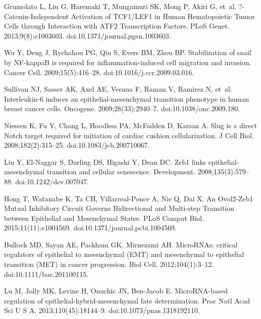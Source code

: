 \documentclass[11pt,letterpaper]{article}
\begin{document}
\begin{thebibliography}{10}
Grumolato L, Liu G, Haremaki T, Mungamuri SK, Mong P, Akiri G, et~al.
\newblock ?-Catenin-Independent Activation of TCF1/LEF1 in Human Hematopoietic
  Tumor Cells through Interaction with ATF2 Transcription Factors.
\newblock PLoS Genet. 2013;9(8):e1003603.
\newblock doi:{10.1371/journal.pgen.1003603}.

Wu Y, Deng J, Rychahou PG, Qiu S, Evers BM, Zhou BP.
\newblock Stabilization of snail by NF-kappaB is required for
  inflammation-induced cell migration and invasion.
\newblock Cancer Cell. 2009;15(5):416--28.
\newblock doi:{10.1016/j.ccr.2009.03.016}.

Sullivan NJ, Sasser AK, Axel AE, Vesuna F, Raman V, Ramirez N, et~al.
\newblock Interleukin-6 induces an epithelial-mesenchymal transition phenotype
  in human breast cancer cells.
\newblock Oncogene. 2009;28(33):2940--7.
\newblock doi:{10.1038/onc.2009.180}.

Niessen K, Fu Y, Chang L, Hoodless PA, McFadden D, Karsan A.
\newblock Slug is a direct Notch target required for initiation of cardiac
  cushion cellularization.
\newblock J Cell Biol. 2008;182(2):315--25.
\newblock doi:{10.1083/jcb.200710067}.

Liu Y, El-Naggar S, Darling DS, Higashi Y, Dean DC.
\newblock Zeb1 links epithelial-mesenchymal transition and cellular senescence.
\newblock Development. 2008;135(3):579--88.
\newblock doi:{10.1242/dev.007047}.

Hong T, Watanabe K, Ta CH, Villarreal-Ponce A, Nie Q, Dai X.
\newblock An Ovol2-Zeb1 Mutual Inhibitory Circuit Governs Bidirectional and
  Multi-step Transition between Epithelial and Mesenchymal States.
\newblock PLoS Comput Biol. 2015;11(11):e1004569.
\newblock doi:{10.1371/journal.pcbi.1004569}.

Bullock MD, Sayan AE, Packham GK, Mirnezami AH.
\newblock MicroRNAs: critical regulators of epithelial to mesenchymal (EMT) and
  mesenchymal to epithelial transition (MET) in cancer progression.
\newblock Biol Cell. 2012;104(1):3--12.
\newblock doi:{10.1111/boc.201100115}.

Lu M, Jolly MK, Levine H, Onuchic JN, Ben-Jacob E.
\newblock MicroRNA-based regulation of epithelial-hybrid-mesenchymal fate
  determination.
\newblock Proc Natl Acad Sci U S A. 2013;110(45):18144--9.
\newblock doi:{10.1073/pnas.1318192110}.


\end{thebibliography}
\end{document}

